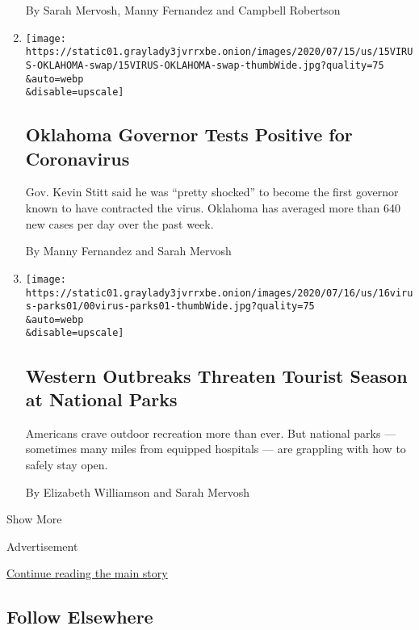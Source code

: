 \begin{enumerate}
  By Sarah Mervosh, Manny Fernandez and Campbell Robertson
\item
  \href{/2020/07/15/us/oklahoma-governor-coronavirus-stitt.html}{}

  \texttt{[image: https://static01.graylady3jvrrxbe.onion/images/2020/07/15/us/15VIRUS-OKLAHOMA-swap/15VIRUS-OKLAHOMA-swap-thumbWide.jpg?quality=75\\\&auto=webp\\\&disable=upscale]}

  \hypertarget{oklahoma-governor-tests-positive-for-coronavirus}{%
  \subsection{Oklahoma Governor Tests Positive for
  Coronavirus}\label{oklahoma-governor-tests-positive-for-coronavirus}}

  Gov. Kevin Stitt said he was ``pretty shocked'' to become the first
  governor known to have contracted the virus. Oklahoma has averaged
  more than 640 new cases per day over the past week.

  By Manny Fernandez and Sarah Mervosh
\item
  \href{/2020/07/15/us/national-parks-reopening.html}{}

  \texttt{[image: https://static01.graylady3jvrrxbe.onion/images/2020/07/16/us/16virus-parks01/00virus-parks01-thumbWide.jpg?quality=75\\\&auto=webp\\\&disable=upscale]}

  \hypertarget{western-outbreaks-threaten-tourist-season-at-national-parks}{%
  \subsection{Western Outbreaks Threaten Tourist Season at National
  Parks}\label{western-outbreaks-threaten-tourist-season-at-national-parks}}

  Americans crave outdoor recreation more than ever. But national parks
  --- sometimes many miles from equipped hospitals --- are grappling
  with how to safely stay open.

  By Elizabeth Williamson and Sarah Mervosh
\end{enumerate}

Show More

Advertisement

\protect\hyperlink{after-mid2}{Continue reading the main story}

\hypertarget{follow-elsewhere}{%
\subsection{Follow Elsewhere}\label{follow-elsewhere}}

